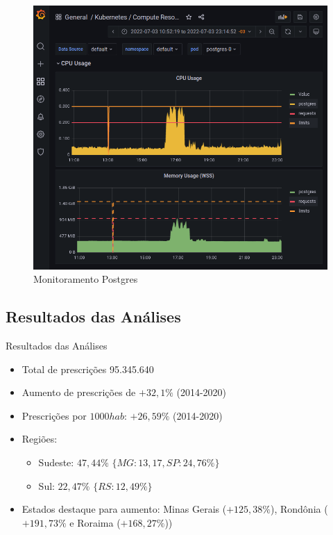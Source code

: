 \documentclass[10pt,brazil]{beamer}
\theoremstyle{definition}
\begin{document}
\begin{frame}[plain]
  \hspace*{-10mm}
    \begin{figure}
    \centering  
  \includegraphics[width=.6\paperwidth]{postgres_resource.png}
      \caption[Monitoramento Postgres]{Monitoramento Postgres}
  \end{figure}  
\end{frame}

\subsection{Resultados das Análises}
\begin{frame}{Resultados das Análises}

    \begin{itemize}
      \item Total de prescrições 95.345.640 
      \item Aumento de prescrições de $+32,1\%$ (2014-2020)
      \item Prescrições por $1000 hab$: $+26,59\%$ (2014-2020)
      
      \item Regiões:
        \begin{itemize}
          \item Sudeste: $47,44\%$ $\{MG: 13,17,SP: 24,76\%\}$
          \item Sul: $22,47\%$ $\{RS: 12,49\%\}$
        \end{itemize}
      \item Estados destaque para aumento:  Minas Gerais ($+125,38\%$), Rondônia ($+191,73\%$ e Roraima ($+168,27\%$))
    \end{itemize}
\end{frame}
\end{document}
